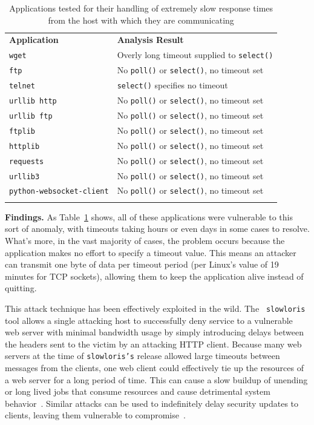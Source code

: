\begin{table}[t]
  \scriptsize{}
  \begin{tabular}{l | l}
    \toprule{}
    {\bf Application}              & {\bf Analysis Result}\\
    {\tt wget}                     & Overly long timeout supplied to {\tt select()} \\
    {\tt ftp}                      & No {\tt poll()} or {\tt select()}, no timeout set \\
    {\tt telnet}                   & {\tt select()} specifies no timeout \\
    {\tt urllib http}              & No {\tt poll()} or {\tt select()}, no timeout set \\
    {\tt urllib ftp}               & No {\tt poll()} or {\tt select()}, no timeout set \\
    {\tt ftplib}                   & No {\tt poll()} or {\tt select()}, no timeout set \\
    {\tt httplib}                  & No {\tt poll()} or {\tt select()}, no timeout set \\
    {\tt requests}                 & No {\tt poll()} or {\tt select()}, no timeout set \\
    {\tt urllib3}                  & No {\tt poll()} or {\tt select()}, no timeout set \\
    {\tt python-websocket-client}  & No {\tt poll()} or {\tt select()}, no timeout set \\
    \bottomrule{}
  \end{tabular}
  \caption{Applications tested for their handling of extremely slow response
    times from the host with which they are communicating }
  \label{table:slowloris}
\end{table}


{\bf Findings.} As Table~\ref{table:slowloris} shows, all of these
applications were vulnerable to this sort of anomaly, with timeouts taking
hours or even days in some cases to resolve.
What's more, in the vast majority of
cases, the problem occurs because the application makes no effort to
specify a timeout value.  This means an attacker can transmit one byte of
data per timeout period (per Linux's value of 19 minutes for TCP sockets),
allowing them to keep the application alive instead of quitting.


This attack technique has been effectively exploited in the wild.  The {\tt
slowloris} tool allows a single attacking host to successfully deny service
to a vulnerable web server with minimal bandwidth usage by simply
introducing delays between the headers sent to the victim by an attacking
HTTP client.  Because many web servers at the time  of {\tt slowloris's} release
allowed large timeouts
between messages from the clients, one web client could effectively tie up
the resources of a web server for a long period of time.
This can cause a slow buildup of unending or long lived jobs that consume
resources and cause detrimental system behavior~\cite{Slowloris}.
Similar attacks can be used to indefinitely delay security updates to
clients, leaving them vulnerable to compromise~\cite{Cappos_TR_08}.


